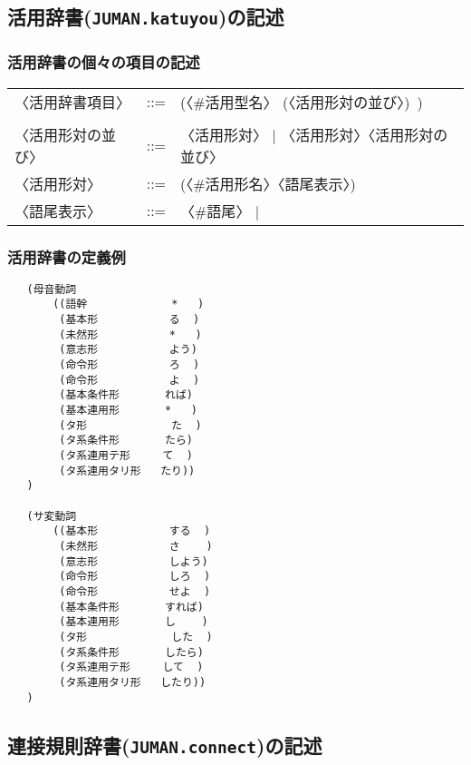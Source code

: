 \documentclass[a4j,titlepage]{jarticle}
\begin{document}
\clearpage

\subsection{活用辞書({\tt JUMAN.katuyou})の記述}\label{app:katuyou}

\subsubsection{活用辞書の個々の項目の記述}

\begin{tt}
\begin{tabular}{lll}
〈活用辞書項目〉& ::= & (〈\#活用型名〉 (〈活用形対の並び〉)\ ) \\
\\
〈活用形対の並び〉& ::= & 〈活用形対〉
                        | 〈活用形対〉〈活用形対の並び〉\\
〈活用形対〉 & ::= & (〈\#活用形名〉〈語尾表示〉) \\
〈語尾表示〉 & ::= & 〈\#語尾〉 | {\tt *}
\end{tabular}
\end{tt}

\subsubsection{活用辞書の定義例}\label{app:katuyou_rei}

\begin{verbatim}
   (母音動詞
       ((語幹             *   )
        (基本形           る  )
        (未然形           *   )
        (意志形           よう)
        (命令形           ろ  )
        (命令形           よ  )
        (基本条件形       れば)
        (基本連用形       *   )
        (タ形             た  )
        (タ系条件形       たら)
        (タ系連用テ形     て  )
        (タ系連用タリ形   たり))
   )

   (サ変動詞
       ((基本形           する  )
        (未然形           さ    )
        (意志形           しよう)
        (命令形           しろ  )
        (命令形           せよ  )
        (基本条件形       すれば)
        (基本連用形       し    )
        (タ形             した  )
        (タ系条件形       したら)
        (タ系連用テ形     して  )
        (タ系連用タリ形   したり))
   )
\end{verbatim}

\clearpage

\subsection{連接規則辞書({\tt JUMAN.connect})の記述}\label{app:connect}
\end{document}
